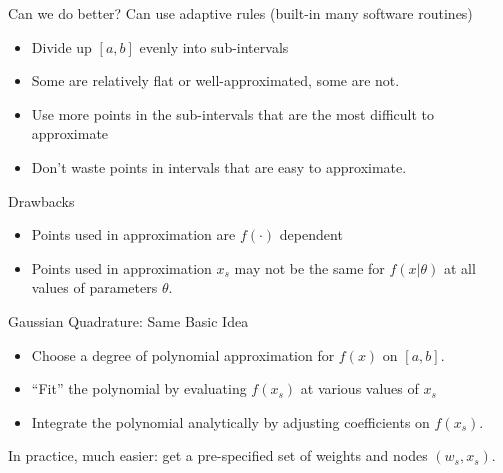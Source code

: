 \documentclass[xcolor=pdftex,dvipsnames,table,mathserif,aspectratio=169]{beamer}
\begin{document}
\begin{frame}{Can we do better?}
Can use \alert{adaptive rules} (built-in many software routines)
\begin{itemize}
\item Divide up $[a,b]$ evenly into sub-intervals
\item Some are relatively flat or well-approximated, some are not.
\item Use more points in the sub-intervals that are the most difficult to approximate
\item Don't waste points in intervals that are easy to approximate.
\end{itemize}
Drawbacks
\begin{itemize}
\item Points used in approximation are $f(\cdot)$ dependent
\item Points used in approximation $x_s$ may not be the same for $f(x | \theta)$ at all values of parameters $\theta$.
\end{itemize}
\end{frame}



\begin{frame}{Gaussian Quadrature: Same Basic Idea}
\begin{itemize}
\item Choose a degree of polynomial approximation for $f(x)$ on $[a,b]$.
\item ``Fit'' the polynomial by evaluating $f(x_s)$ at various values of $x_s$
\item Integrate the polynomial analytically by adjusting coefficients on $f(x_s)$.
\end{itemize}
In practice, much easier: get a pre-specified set of weights and nodes $(w_s,x_s)$.
\end{frame}
\end{document}
